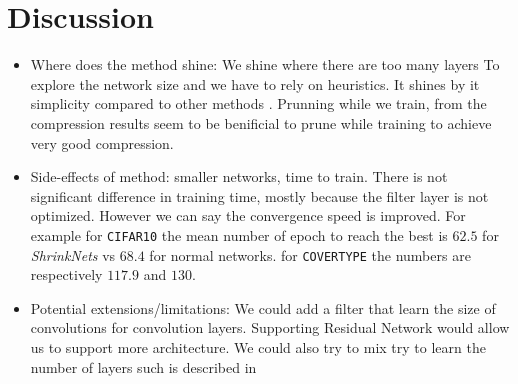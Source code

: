 \section{Discussion}


\begin{itemize}
  \item Where does the method shine:  We shine where there are too many layers
    To explore the network size and we have to rely on heuristics. It shines by
    it simplicity compared to other methods . Prunning while we train, from the compression
    results seem to be benificial to prune while training to achieve very good
    compression.
  \item Side-effects of method: smaller networks, time to train. There is not
    significant difference in training time, mostly because the filter layer is
    not optimized. However we can say the convergence speed is improved. For
    example for \texttt{CIFAR10} the mean number of epoch to reach the best is $62.5$ for \textit{ShrinkNets} vs $68.4$ for normal networks. for \texttt{COVERTYPE}
    the numbers are respectively $117.9$ and $130$.
  \item Potential extensions/limitations: We could add a filter that learn the
    size of convolutions for convolution layers. Supporting Residual Network
    would allow us to support more architecture. We could also try to mix try to
    learn the number of layers such is described in~\cite{meier}
\end{itemize}